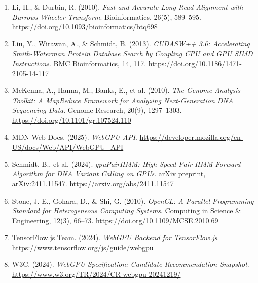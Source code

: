 \documentclass[PhD]{PHlab-thesis}
\begin{document}
\begin{enumerate}
    \item Li, H., \& Durbin, R. (2010). \emph{Fast and Accurate Long-Read Alignment with Burrows-Wheeler Transform}. Bioinformatics, 26(5), 589–595. \url{https://doi.org/10.1093/bioinformatics/btq698}
    \item Liu, Y., Wirawan, A., \& Schmidt, B. (2013). \emph{CUDASW++ 3.0: Accelerating Smith-Waterman Protein Database Search by Coupling CPU and GPU SIMD Instructions}. BMC Bioinformatics, 14, 117. \url{https://doi.org/10.1186/1471-2105-14-117}
    \item McKenna, A., Hanna, M., Banks, E., et al. (2010). \emph{The Genome Analysis Toolkit: A MapReduce Framework for Analyzing Next-Generation DNA Sequencing Data}. Genome Research, 20(9), 1297–1303. \url{https://doi.org/10.1101/gr.107524.110}
    \item MDN Web Docs. (2025). \emph{WebGPU API}. \url{https://developer.mozilla.org/en-US/docs/Web/API/WebGPU_API}
    \item Schmidt, B., et al. (2024). \emph{gpuPairHMM: High-Speed Pair-HMM Forward Algorithm for DNA Variant Calling on GPUs}. arXiv preprint, arXiv:2411.11547. \url{https://arxiv.org/abs/2411.11547}
    \item Stone, J. E., Gohara, D., \& Shi, G. (2010). \emph{OpenCL: A Parallel Programming Standard for Heterogeneous Computing Systems}. Computing in Science \& Engineering, 12(3), 66–73. \url{https://doi.org/10.1109/MCSE.2010.69}
    \item TensorFlow.js Team. (2024). \emph{WebGPU Backend for TensorFlow.js}. \url{https://www.tensorflow.org/js/guide/webgpu}
    \item W3C. (2024). \emph{WebGPU Specification: Candidate Recommendation Snapshot}. \url{https://www.w3.org/TR/2024/CR-webgpu-20241219/}
\end{enumerate}
\newpage
{}
\printbibliography
\end{document}
